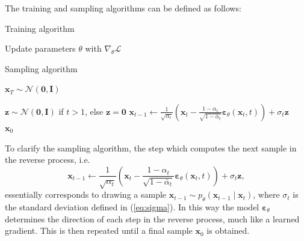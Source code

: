 \documentclass{report}
\begin{document}
The training and sampling algorithms can be defined as follows:

\begin{paracol}{2}

\begin{algorithm}[H]
\caption{Training algorithm}\label{alg:train}
\begin{algorithmic}

\Repeat
    \State Update parameters $\theta$ with $\nabla_{\theta}\mathcal{L}$ 


\end{algorithmic}
\end{algorithm}

\switchcolumn

\setcounter{algorithm}{1}
\begin{algorithm}[H]
\caption{Sampling algorithm}\label{alg:samp}
\begin{algorithmic}

\State $\bm{x}_T \sim \mathcal{N}(\bm{0}, \bm{I})$

\State $\bm{z} \sim \mathcal{N}(\bm{0}, \bm{I})$ if $t>1$, else $\bm{z} = \bm{0}$
\State $\bm{x}_{t-1} \gets \frac{1}{\sqrt{\alpha_t}}\left( \bm{x}_t- \frac{1-\alpha_t}{\sqrt{1-\bar{\alpha}_t}} \bm{\varepsilon}_{\theta}(\bm{x}_t, t)\right) + \sigma_t \bm{z}$
\EndFor \\
\Return $\bm{x}_0$

\end{algorithmic}
\end{algorithm}

\end{paracol}

To clarify the sampling algorithm, the step which computes the next sample in the reverse process, i.e.
\begin{equation}
    \bm{x}_{t-1} \gets \frac{1}{\sqrt{\alpha_t}}\left( \bm{x}_t- \frac{1-\alpha_t}{\sqrt{1-\bar{\alpha}_t}} \bm{\varepsilon}_{\theta}(\bm{x}_t, t)\right) + \sigma_t \bm{z},
\end{equation}
essentially corresponds to drawing a sample $\bm{x}_{t-1} \sim p_{\theta}(\bm{x}_{t-1} \mid \bm{x}_t)$, where $\sigma_t$ is the standard deviation defined in (\ref{eq:sigma}).  In this way the model $\bm{\varepsilon}_{\theta}$ determines the direction of each step in the reverse process, much like a learned gradient. This is then repeated until a final sample $\bm{x}_0$ is obtained.
\end{document}
